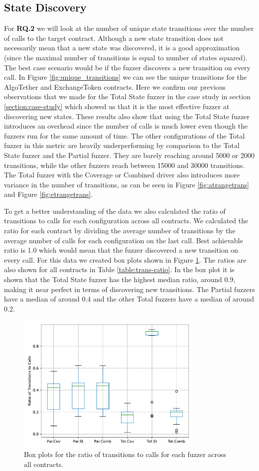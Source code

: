 \subsection*{State Discovery}
For \textbf{RQ.2} we will look at the number of unique state transitions over the number of calls to the target contract.
Although a new state transition does not necessarily mean that a new state was discovered, it is a good approximation (since the maximal number of transitions is equal to number of states squared).
The best case scenario would be if the fuzzer discovers a new transition on every call.
In Figure \ref{fig:unique_transitions} we can see the unique transitions for the AlgoTether and ExchangeToken contracts.
Here we confirm our previous observations that we made for the Total State fuzzer in the case study in section \ref{section:case-study} which showed us that it is the most effective fuzzer at discovering new states.
These results also show that using the Total State fuzzer introduces an overhead since the number of calls is much lower even though the fuzzers run for the same amount of time.
The other configurations of the Total fuzzer in this metric are heavily underperforming by comparison to the Total State fuzzer and the Partial fuzzer. They are barely reaching around 5000 or 2000 transitions, while the other fuzzers reach between 15000 and 30000 transitions. The Total fuzzer with the Coverage or Combined driver also introduces more variance in the number of transitions, as can be seen in Figure \ref{fig:atrangetrans} and Figure \ref{fig:etrangetrans}.

To get a better understanding of the data we also calculated the ratio of transitions to calls for each configuration across all contracts.
We calculated the ratio for each contract by dividing the average number of transitions by the average number of calls for each configuration on the last call.
Best achievable ratio is 1.0 which would mean that the fuzzer discovered a new transition on every call.
For this data we created box plots shown in Figure \ref{fig:trans-ratio}.
The ratios are also shown for all contracts in Table \ref{table:trans-ratio}.
In the box plot it is shown that the Total State fuzzer has the highest median ratio, around 0.9, making it near perfect in terms of discovering new transitions.
The Partial fuzzers have a median of around 0.4 and the other Total fuzzers have a median of around 0.2.

\begin{figure}[t]
    \centering
    \includegraphics*[width=0.8\textwidth]{charts/trans-ratio.pdf}
    \caption{Box plots for the ratio of transitions to calls for each fuzzer across all contracts.}\label{fig:trans-ratio}
\end{figure}

